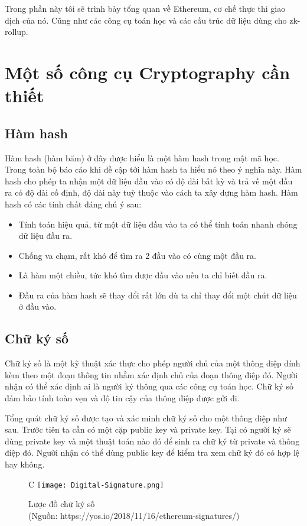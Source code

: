 \documentclass[../thesis.tex]{subfiles}
\begin{document}
Trong phần này tôi sẽ trình bày tổng quan về Ethereum, cơ chế thực thi giao dịch của nó. Cũng như các công cụ toán học và các cấu trúc dữ liệu dùng cho zk-rollup.

\section{Một số công cụ Cryptography cần thiết}

\subsection{Hàm hash}
Hàm hash (hàm băm) ở đây được hiểu là một hàm hash trong mật mã học. Trong toàn bộ báo cáo khi đề cập tới hàm hash ta hiểu nó theo ý nghĩa này. Hàm hash cho phép ta nhận một dữ liệu đầu vào có độ dài bất kỳ và trả về một đầu ra có độ dài cố định, độ dài này tuỳ thuộc vào cách ta xây dựng hàm hash.
Hàm hash có các tính chất đáng chú ý sau: 
\begin{itemize}
\item Tính toán hiệu quả, từ một dữ liệu đầu vào ta có thể tính toán nhanh chóng dữ liệu đầu ra.
\item Chống va chạm, rất khó để tìm ra 2 đầu vào có cùng một đầu ra. 
\item Là hàm một chiều, tức khó tìm được đầu vào nếu ta chỉ biết đầu ra. 
\item Đầu ra của hàm hash sẽ thay đổi rất lớn dù ta chỉ thay đổi một chút dữ liệu ở đầu vào.
\end{itemize}
\subsection{Chữ ký số}

Chữ ký số là một kỹ thuật xác thực cho phép người chủ của một thông điệp đính kèm theo một đoạn thông tin nhằm xác định chủ của đoạn thông điệp đó. Người nhận có thể xác định ai là người ký thông qua các công cụ toán học. Chữ ký số đảm bảo tính toàn vẹn và độ tin cậy của thông điệp được gửi đi.

Tổng quát chữ ký số được tạo và xác minh chữ ký số cho một thông điệp như sau. Trước tiên ta cần có một cặp public key và private key. Tại có người ký sẽ dùng private key và một thuật toán nào đó để sinh ra chữ ký từ private và thông điệp đó. Người nhận có thể dùng public key để kiểm tra xem chữ ký đó có hợp lệ hay không.

\begin{figure}[ht]
   \centering
C   \texttt{[image: Digital-Signature.png]}
   \caption{Lược đồ chữ ký số \\ (Nguồn: https://yos.io/2018/11/16/ethereum-signatures/)}
\end{figure}
\end{document}
